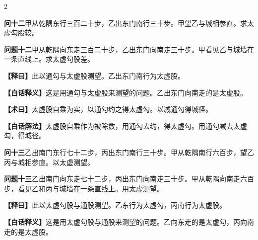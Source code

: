 \documentclass[11pt,a4paper]{article}
\newcommand{\WenQuestion}[1]{\textbf{\textcolor{classicalcolor}{#1}}}
\newcommand{\BaiQuestion}[1]{\textbf{\textcolor{moderncolor}{#1}}}
\newcommand{\WenExplain}{\textcolor{classicalcolor}{\textbf{【释曰】}}}
\newcommand{\BaiExplain}{\textcolor{moderncolor}{\textbf{【白话释义】}}}
\newcommand{\WenMethod}{\textcolor{classicalcolor}{\textbf{【术曰】}}}
\newcommand{\BaiMethod}{\textcolor{moderncolor}{\textbf{【白话解法】}}}
\begin{document}
\begin{paracol}{2}
\vspace{0.8em}

\switchcolumn*
\begin{tcolorbox}[colback=red!3,colframe=red!30!black,boxrule=0.3pt]
\WenQuestion{问十二}\quad 甲从乾隅东行三百二十步，乙出东门南行三十步。甲望乙与城相参直。求太虚勾股较。
\end{tcolorbox}
\switchcolumn
\begin{tcolorbox}[colback=blue!3,colframe=blue!30!black,boxrule=0.3pt]
\BaiQuestion{问题十二}\quad 甲从乾隅向东走三百二十步，乙出东门向南走三十步。甲看见乙与城墙在一条直线上。求太虚勾股差。
\end{tcolorbox}

\switchcolumn*
\begin{tcolorbox}[colback=red!5,colframe=red!30!black,boxrule=0.3pt]
\WenExplain\quad 此以通勾与太虚股测望。乙出东门南行为太虚股。
\end{tcolorbox}
\switchcolumn
\begin{tcolorbox}[colback=blue!5,colframe=blue!30!black,boxrule=0.3pt]
\BaiExplain\quad 这是用通勾与太虚股来测望的问题。乙出东门向南走的是太虚股。
\end{tcolorbox}

\switchcolumn*
\begin{tcolorbox}[colback=red!5,colframe=red!40!black,boxrule=0.3pt]
\WenMethod\quad 太虚股自乘为实，以通勾约之得太虚勾。以减通勾得城径。
\end{tcolorbox}
\switchcolumn
\begin{tcolorbox}[colback=blue!5,colframe=blue!40!black,boxrule=0.3pt]
\BaiMethod\quad 太虚股自乘作为被除数，用通勾去约，得太虚勾。用通勾减去太虚勾，得城径。
\end{tcolorbox}

\vspace{0.8em}

\switchcolumn*
\begin{tcolorbox}[colback=red!3,colframe=red!30!black,boxrule=0.3pt]
\WenQuestion{问十三}\quad 乙出南门东行七十二步，丙出东门南行三十步。甲从乾隅南行六百步，望乙丙与城相参直。以太虚测望。
\end{tcolorbox}
\switchcolumn
\begin{tcolorbox}[colback=blue!3,colframe=blue!30!black,boxrule=0.3pt]
\BaiQuestion{问题十三}\quad 乙出南门向东走七十二步，丙出东门向南走三十步。甲从乾隅向南走六百步，看见乙和丙与城墙在一条直线上。用太虚测望。
\end{tcolorbox}

\switchcolumn*
\begin{tcolorbox}[colback=red!5,colframe=red!30!black,boxrule=0.3pt]
\WenExplain\quad 此以太虚勾股与通股测望。乙东行为太虚勾，丙南行为太虚股。
\end{tcolorbox}
\switchcolumn
\begin{tcolorbox}[colback=blue!5,colframe=blue!30!black,boxrule=0.3pt]
\BaiExplain\quad 这是用太虚勾股与通股来测望的问题。乙向东走的是太虚勾，丙向南走的是太虚股。
\end{tcolorbox}


\end{paracol}
\end{document}
